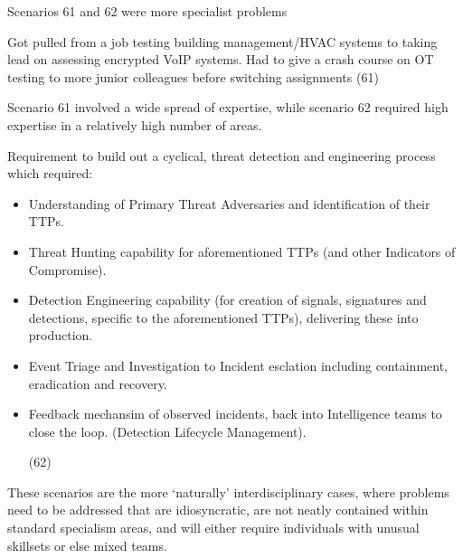 \documentclass[
  a4paper,
]{book}
\begin{document}
Scenarios 61 and 62 were more specialist problems

\begin{tcolorbox}[enhanced jigsaw, leftrule=.75mm, colframe=quarto-callout-note-color-frame, opacityback=0, breakable, left=2mm, rightrule=.15mm, bottomrule=.15mm, colback=white, arc=.35mm, toprule=.15mm]

Got pulled from a job testing building management/HVAC systems to taking
lead on assessing encrypted VoIP systems. Had to give a crash course on
OT testing to more junior colleagues before switching assignments (61)

\end{tcolorbox}

Scenario 61 involved a wide spread of expertise, while scenario 62
required high expertise in a relatively high number of areas.

\begin{tcolorbox}[enhanced jigsaw, leftrule=.75mm, colframe=quarto-callout-note-color-frame, opacityback=0, breakable, left=2mm, rightrule=.15mm, bottomrule=.15mm, colback=white, arc=.35mm, toprule=.15mm]

Requirement to build out a cyclical, threat detection and engineering
process which required:

\begin{itemize}
\item
  Understanding of Primary Threat Adversaries and identification of
  their TTPs.
\item
  Threat Hunting capability for aforementioned TTPs (and other
  Indicators of Compromise).
\item
  Detection Engineering capability (for creation of signals, signatures
  and detections, specific to the aforementioned TTPs), delivering these
  into production.
\item
  Event Triage and Investigation to Incident esclation including
  containment, eradication and recovery.
\item
  Feedback mechansim of observed incidents, back into Intelligence teams
  to close the loop. (Detection Lifecycle Management).

  (62)
\end{itemize}

\end{tcolorbox}

These scenarios are the more `naturally' interdisciplinary cases, where
problems need to be addressed that are idiosyncratic, are not neatly
contained within standard specialism areas, and will either require
individuals with unusual skillsets or else mixed teams.
\end{document}
